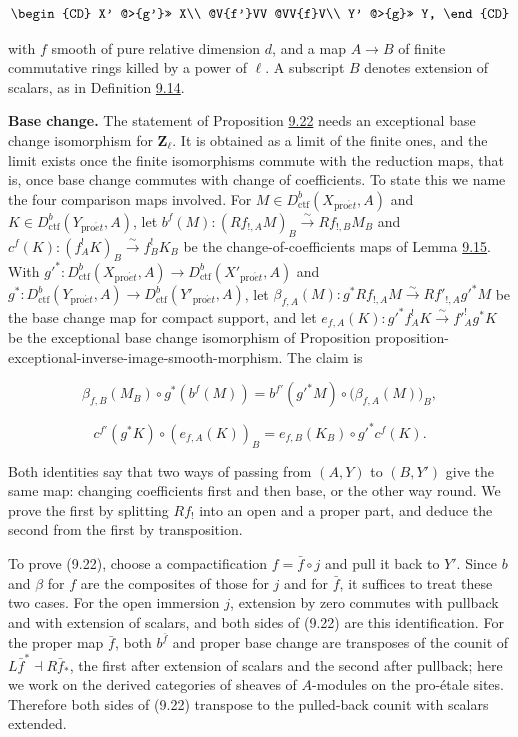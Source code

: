 \documentclass[11pt]{article}
\begin{document}
\[
\begin{CD}
X' @>{g'}>> X\\
@V{f'}VV @VV{f}V\\
Y' @>{g}>> Y,
\end{CD}
\]

with \(f\) smooth of pure relative dimension \(d\), and a map \(A\to B\) of finite commutative rings killed by a power of \(\ell\). A subscript \(B\) denotes extension of scalars, as in Definition \hyperref[bp47]{9.14}.

\textbf{Base change.} The statement of Proposition \hyperref[bp78]{9.22} needs an exceptional base change isomorphism for \(\mathbf Z_\ell\). It is obtained as a limit of the finite ones, and the limit exists once the finite isomorphisms commute with the reduction maps, that is, once base change commutes with change of coefficients. To state this we name the four comparison maps involved. For \(M\in D^b_{\mathrm{ctf}}(X_{\mathrm{pro}\acute{e}t},A)\) and \(K\in D^b_{\mathrm{ctf}}(Y_{\mathrm{pro}\acute{e}t},A)\), let \(b^f(M):(Rf_{!,A}M)_B\xrightarrow{\sim}Rf_{!,B}M_B\) and \(c^f(K):(f_A^!K)_B\xrightarrow{\sim}f_B^!K_B\) be the change-of-coefficients maps of Lemma \hyperref[bp49]{9.15}. With \(g'^*:D^b_{\mathrm{ctf}}(X_{\mathrm{pro}\acute{e}t},A)\to D^b_{\mathrm{ctf}}(X'_{\mathrm{pro}\acute{e}t},A)\) and \(g^*:D^b_{\mathrm{ctf}}(Y_{\mathrm{pro}\acute{e}t},A)\to D^b_{\mathrm{ctf}}(Y'_{\mathrm{pro}\acute{e}t},A)\), let \(\beta_{f,A}(M):g^*Rf_{!,A}M\xrightarrow{\sim}Rf'_{!,A}g'^*M\) be the base change map for compact support, and let \(e_{f,A}(K):g'^*f_A^!K\xrightarrow{\sim}f'^!_Ag^*K\) be the exceptional base change isomorphism of Proposition proposition-exceptional-inverse-image-smooth-morphism. The claim is

\[
\beta_{f,B}(M_B)\circ g^*(b^f(M))
=b^{f'}(g'^*M)\circ\bigl(\beta_{f,A}(M)\bigr)_B,
\tag{9.22}
\]

\[
c^{f'}(g^*K)\circ(e_{f,A}(K))_B
=e_{f,B}(K_B)\circ g'^*c^f(K).
\tag{9.23}
\]

Both identities say that two ways of passing from \((A,Y)\) to \((B,Y')\) give the same map: changing coefficients first and then base, or the other way round. We prove the first by splitting \(Rf_!\) into an open and a proper part, and deduce the second from the first by transposition.

To prove (9.22), choose a compactification \(f=\bar f\circ j\) and pull it back to \(Y'\). Since \(b\) and \(\beta\) for \(f\) are the composites of those for \(j\) and for \(\bar f\), it suffices to treat these two cases. For the open immersion \(j\), extension by zero commutes with pullback and with extension of scalars, and both sides of (9.22) are this identification. For the proper map \(\bar f\), both \(b^{\bar f}\) and proper base change are transposes of the counit of \(L\bar f^*\dashv R\bar f_*\), the first after extension of scalars and the second after pullback; here we work on the derived categories of sheaves of \(A\)-modules on the pro-étale sites. Therefore both sides of (9.22) transpose to the pulled-back counit with scalars extended.
\end{document}
